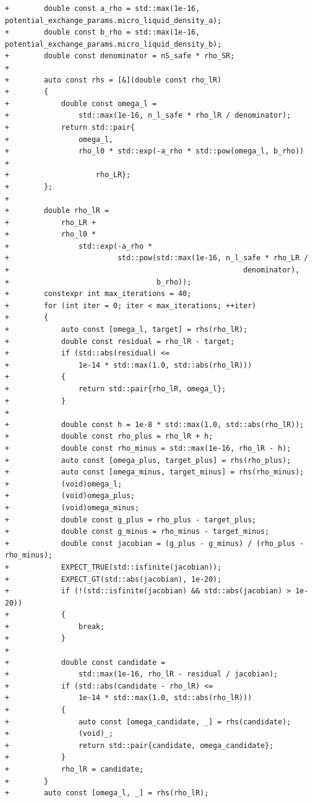 \documentclass[10pt]{article}
\begin{document}
\begin{lstlisting}
+        double const a_rho = std::max(1e-16, potential_exchange_params.micro_liquid_density_a);
+        double const b_rho = std::max(1e-16, potential_exchange_params.micro_liquid_density_b);
+        double const denominator = nS_safe * rho_SR;
+
+        auto const rhs = [&](double const rho_lR)
+        {
+            double const omega_l =
+                std::max(1e-16, n_l_safe * rho_lR / denominator);
+            return std::pair{
+                omega_l,
+                rho_l0 * std::exp(-a_rho * std::pow(omega_l, b_rho)) +
+                    rho_LR};
+        };
+
+        double rho_lR =
+            rho_LR +
+            rho_l0 *
+                std::exp(-a_rho *
+                         std::pow(std::max(1e-16, n_l_safe * rho_LR /
+                                                      denominator),
+                                  b_rho));
+        constexpr int max_iterations = 40;
+        for (int iter = 0; iter < max_iterations; ++iter)
+        {
+            auto const [omega_l, target] = rhs(rho_lR);
+            double const residual = rho_lR - target;
+            if (std::abs(residual) <=
+                1e-14 * std::max(1.0, std::abs(rho_lR)))
+            {
+                return std::pair{rho_lR, omega_l};
+            }
+
+            double const h = 1e-8 * std::max(1.0, std::abs(rho_lR));
+            double const rho_plus = rho_lR + h;
+            double const rho_minus = std::max(1e-16, rho_lR - h);
+            auto const [omega_plus, target_plus] = rhs(rho_plus);
+            auto const [omega_minus, target_minus] = rhs(rho_minus);
+            (void)omega_l;
+            (void)omega_plus;
+            (void)omega_minus;
+            double const g_plus = rho_plus - target_plus;
+            double const g_minus = rho_minus - target_minus;
+            double const jacobian = (g_plus - g_minus) / (rho_plus - rho_minus);
+            EXPECT_TRUE(std::isfinite(jacobian));
+            EXPECT_GT(std::abs(jacobian), 1e-20);
+            if (!(std::isfinite(jacobian) && std::abs(jacobian) > 1e-20))
+            {
+                break;
+            }
+
+            double const candidate =
+                std::max(1e-16, rho_lR - residual / jacobian);
+            if (std::abs(candidate - rho_lR) <=
+                1e-14 * std::max(1.0, std::abs(rho_lR)))
+            {
+                auto const [omega_candidate, _] = rhs(candidate);
+                (void)_;
+                return std::pair{candidate, omega_candidate};
+            }
+            rho_lR = candidate;
+        }
+        auto const [omega_l, _] = rhs(rho_lR);

\end{lstlisting}
\end{document}
